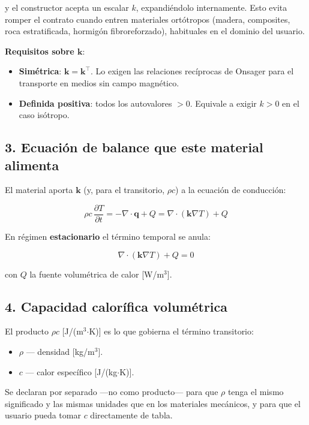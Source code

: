 \documentclass[11pt,letterpaper,oneside]{report}
\begin{document}
y el constructor acepta un escalar $k$, expandiéndolo internamente. Esto evita romper el contrato cuando entren materiales ortótropos (madera, composites, roca estratificada, hormigón fibroreforzado), habituales en el dominio del usuario.

\textbf{Requisitos sobre $\mathbf k$}:

\begin{itemize}
  \item \textbf{Simétrica}: $\mathbf k = \mathbf k^\top$. Lo exigen las relaciones recíprocas de Onsager para el transporte en medios sin campo magnético.
  \item \textbf{Definida positiva}: todos los autovalores $> 0$. Equivale a exigir $k > 0$ en el caso isótropo.
\end{itemize}

\subsection{3. Ecuación de balance que este material alimenta}

El material aporta $\mathbf k$ (y, para el transitorio, $\rho c$) a la ecuación de conducción:

\[
\rho c\,\frac{\partial T}{\partial t} = -\nabla\cdot\mathbf q + Q = \nabla\cdot(\mathbf k\nabla T) + Q
\]

En régimen \textbf{estacionario} el término temporal se anula:

\[
\nabla\cdot(\mathbf k\nabla T) + Q = 0
\]

con $Q$ la fuente volumétrica de calor [W/m\ensuremath{^{3}}].

\subsection{4. Capacidad calorífica volumétrica}

El producto $\rho c$ [J/(m\ensuremath{^{3}}\ensuremath{\cdot}K)] es lo que gobierna el término transitorio:

\begin{itemize}
  \item $\rho$ --- densidad [kg/m\ensuremath{^{3}}].
  \item $c$ --- calor específico [J/(kg\ensuremath{\cdot}K)].
\end{itemize}

Se declaran por separado ---no como producto--- para que $\rho$ tenga el mismo significado y las mismas unidades que en los materiales mecánicos, y para que el usuario pueda tomar $c$ directamente de tabla.
\end{document}
